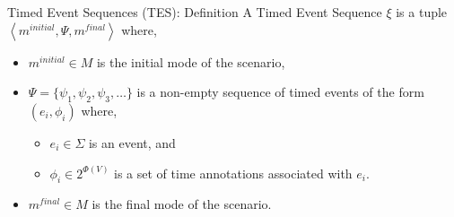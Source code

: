 \documentclass[10pt]{beamer}
\theoremstyle{plain}
\theoremstyle{definition}
\begin{document}
\begin{frame}{Timed Event Sequences (TES): Definition}
	A Timed Event Sequence $\xi$ is a tuple $\left \langle m^{initial}, \Psi, m^{final} \right \rangle$ where,
	\begin{itemize}
		\item $m^{initial} \in M$ is the initial mode of the scenario,
		\item $\Psi = \{\psi_1,\psi_2,\psi_3, \dots\}$ is a non-empty sequence of timed events of the form $(e_i,\phi_i)$ where,
			\begin{itemize}
				\item $e_i \in \Sigma$ is an event, and
				\item $\phi_i \in 2^{\Phi(V)}$ is a set of time annotations associated with $e_i$.
			\end{itemize}
		\item $m^{final} \in M$ is the final mode of the scenario.
		
	\end{itemize}
\end{frame}
\end{document}
